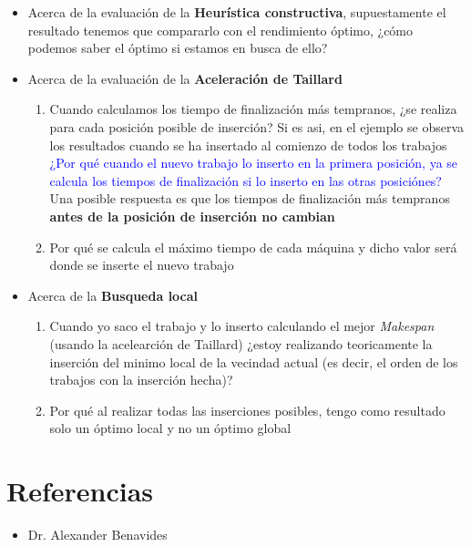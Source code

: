 \documentclass[10pt, a4paper]{article}
\begin{document}
\begin{itemize}
  \item Acerca de la evaluación de la \textbf{Heurística constructiva}, 
    supuestamente el resultado tenemos que compararlo con el rendimiento 
    óptimo, ¿cómo podemos saber el óptimo si estamos en busca de ello?

  \item Acerca de la evaluación de la \textbf{Aceleración de Taillard} 
    \begin{enumerate}
      \item Cuando calculamos los tiempo de finalización más tempranos, ¿se realiza 
        para cada posición posible de inserción? Si es asi, en el ejemplo 
        se observa los resultados cuando se ha insertado al comienzo de todos 
        los trabajos \textcolor{blue}{¿Por qué cuando el nuevo trabajo lo inserto 
        en la primera posición, ya se calcula los tiempos de finalización si lo 
        inserto en las otras posiciónes?} Una posible respuesta es que los tiempos 
        de finalización más tempranos \textbf{antes de la posición de inserción 
        no cambian}

      \item Por qué se calcula el máximo tiempo de cada máquina y dicho valor 
        será donde se inserte el nuevo trabajo
    \end{enumerate}

  \item Acerca de la \textbf{Busqueda local}
    \begin{enumerate}
      \item Cuando yo saco el trabajo y lo inserto calculando el mejor 
        \textit{Makespan} (usando la acelearción de Taillard) ¿estoy realizando 
        teoricamente la inserción del minimo local de la vecindad actual (es 
        decir, el orden de los trabajos con la inserción hecha)?

      \item Por qué al realizar todas las inserciones posibles, tengo como 
        resultado solo un óptimo local y no un óptimo global
    \end{enumerate}
\end{itemize}

\section{Referencias}\label{sec:references}

\begin{itemize}
  \item Dr. Alexander Benavides
\end{itemize}
\end{document}
